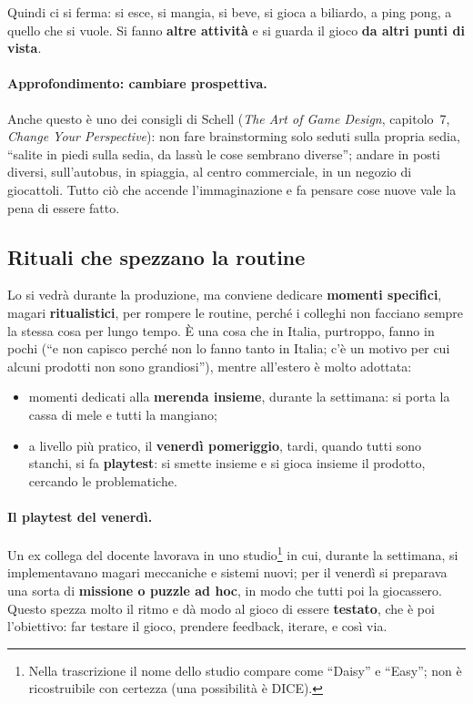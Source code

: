 Quindi ci si ferma: si esce, si mangia, si beve, si gioca a biliardo, a ping
pong, a quello che si vuole. Si fanno \textbf{altre attività} e si guarda il
gioco \textbf{da altri punti di vista}.

\paragraph{Approfondimento: cambiare prospettiva.} Anche questo è uno dei
consigli di Schell (\emph{The Art of Game Design}, capitolo~7, \emph{Change
Your Perspective}): non fare brainstorming solo seduti sulla propria sedia,
``salite in piedi sulla sedia, da lassù le cose sembrano diverse''; andare in
posti diversi, sull'autobus, in spiaggia, al centro commerciale, in un
negozio di giocattoli. Tutto ciò che accende l'immaginazione e fa pensare
cose nuove vale la pena di essere fatto.

\subsection{Rituali che spezzano la routine}

Lo si vedrà durante la produzione, ma conviene dedicare \textbf{momenti
specifici}, magari \textbf{ritualistici}, per rompere le routine, perché i
colleghi non facciano sempre la stessa cosa per lungo tempo. È una cosa che
in Italia, purtroppo, fanno in pochi (``e non capisco perché non lo fanno
tanto in Italia; c'è un motivo per cui alcuni prodotti non sono
grandiosi''), mentre all'estero è molto adottata:
\begin{itemize}
  \item momenti dedicati alla \textbf{merenda insieme}, durante la
        settimana: si porta la cassa di mele e tutti la mangiano;
  \item a livello più pratico, il \textbf{venerdì pomeriggio}, tardi,
        quando tutti sono stanchi, si fa \textbf{playtest}: si smette insieme
        e si gioca insieme il prodotto, cercando le problematiche.
\end{itemize}

\paragraph{Il playtest del venerdì.} Un ex collega del docente lavorava in uno
studio\footnote{Nella trascrizione il nome dello studio compare come
``Daisy'' e ``Easy''; non è ricostruibile con certezza (una possibilità è
DICE).} in cui, durante la settimana, si implementavano magari meccaniche e
sistemi nuovi; per il venerdì si preparava una sorta di \textbf{missione o
puzzle ad hoc}, in modo che tutti poi la giocassero. Questo spezza molto il
ritmo e dà modo al gioco di essere \textbf{testato}, che è poi l'obiettivo:
far testare il gioco, prendere feedback, iterare, e così via.

